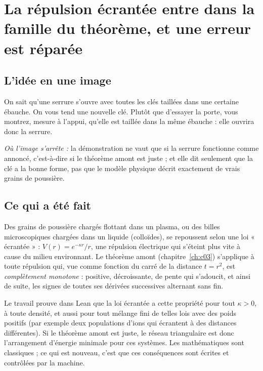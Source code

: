\chapter[Répulsion écrantée, erreur réparée]{La répulsion écrantée entre dans la famille du théorème, et une erreur est réparée}

\section*{L'idée en une image}

\begin{analogie}
On sait qu'une serrure s'ouvre avec toutes les clés taillées dans une certaine ébauche. On vous tend une nouvelle
clé. Plutôt que d'essayer la porte, vous montrez, mesure à l'appui, qu'elle est taillée dans la même ébauche : elle
ouvrira donc la serrure.

\emph{Où l'image s'arrête :} la démonstration ne vaut que si la serrure fonctionne comme annoncé, c'est-à-dire si le
théorème amont est juste ; et elle dit seulement que la clé a la bonne forme, pas que le modèle physique décrit
exactement de vrais grains de poussière.
\end{analogie}

\section*{Ce qui a été fait}

Des grains de poussière chargés flottant dans un plasma, ou des billes microscopiques chargées dans un liquide
(colloïdes), se repoussent selon une loi « écrantée » : $V(r)=e^{-\kappa r}/r$, une répulsion électrique qui
s'éteint plus vite à cause du milieu environnant. Le théorème amont (chapitre~\ref{ch:c03}) s'applique à toute répulsion
qui, vue comme fonction du carré de la distance $t=r^2$, est \emph{complètement monotone} : positive, décroissante,
de pente qui s'adoucit, et ainsi de suite, les signes de toutes ses dérivées successives alternant sans fin.

Le travail prouve dans Lean que la loi écrantée a cette propriété pour tout $\kappa>0$, à toute densité, et aussi
pour tout mélange fini de telles lois avec des poids positifs (par exemple deux populations d'ions qui écrantent à des
distances différentes). Si le théorème amont est juste, le réseau triangulaire est donc l'arrangement d'énergie
minimale pour ces systèmes. Les mathématiques sont classiques ; ce qui est nouveau, c'est que ces conséquences sont
écrites et contrôlées par la machine.

